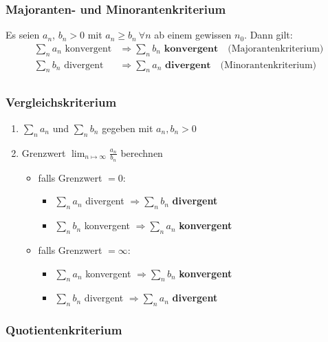 \documentclass[11pt]{article}
\begin{document}
\subsubsection*{Majoranten- und Minorantenkriterium}

Es seien $a_n$, $b_n > 0$ mit $a_n \geq b_n\ \forall n$ ab einem gewissen $n_0$. Dann gilt: 
\begin{equation*}
\begin{split}
	\sum_n a_n \text{ konvergent} & \Rightarrow \sum_n b_n \textbf{ konvergent}\quad \text{(Majorantenkriterium)} \\
	\sum_n b_n \text{ divergent} & \Rightarrow \sum_n a_n \textbf{ divergent}\quad \text{(Minorantenkriterium)} \\
\end{split}
\end{equation*}

\subsubsection*{Vergleichskriterium}

\begin{enumerate}
	\item $\sum_n a_n$ und $\sum_n b_n$ gegeben mit $a_n,b_n > 0$
	\item Grenzwert $\lim_{n\mapsto\infty} \frac{a_n}{b_n}$ berechnen
	\begin{itemize}
		\item falls Grenzwert $= 0$:
		\begin{itemize}
			\item $\sum_n a_n$ divergent $\Rightarrow \sum_n b_n$ \textbf{divergent}
			\item $\sum_n b_n$ konvergent $\Rightarrow \sum_n a_n$ \textbf{konvergent}
		\end{itemize} 
		\item falls Grenzwert $= \infty$:
		\begin{itemize}
			\item $\sum_n a_n$ konvergent $\Rightarrow \sum_n b_n$ \textbf{konvergent}
			\item $\sum_n b_n$ divergent $\Rightarrow \sum_n a_n$ \textbf{divergent}
		\end{itemize} 
	\end{itemize}
\end{enumerate}

\subsubsection*{Quotientenkriterium}
\end{document}
